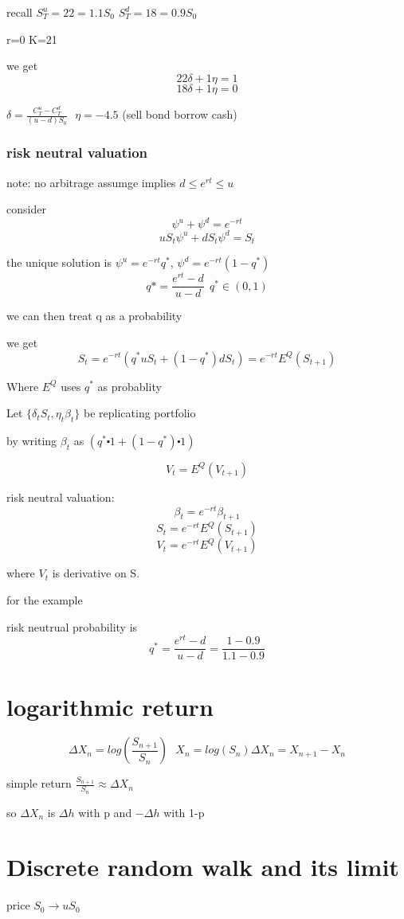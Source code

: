 \documentclass[10pt]{article}
\theoremstyle{break}
\begin{document}
recall $S_T^u = 22 =1.1S_0$
$S_T^d = 18 =0.9S_0$

r=0 K=21

we get 
$$22\delta+1\eta=1$$
$$18\delta+1\eta=0$$

$\delta=\frac{C^u_T-C^d_T}{(u-d)S_0}~~~\eta=-4.5$ (sell bond borrow cash)

\subsubsection{risk neutral valuation}
note: no arbitrage assumge implies $d\leq e^{rt}\leq u$

consider 
$$\psi^u+\psi^d=e^{-rt}$$
$$uS_t\psi^u+dS_t\psi^d=S_t$$

the unique solution is $\psi^u=e^{-rt}q^*$, $\psi^d=e^{-rt}(1-q^*)$
$$q*=\frac{e^{rt}-d}{u-d}~~q^*\in(0,1)$$

we can then treat q as a probability

we get 
$$S_t=e^{-rt}(q^*uS_t+(1-q^*)dS_t)=e^{-rt}E^Q(S_{t+1})$$

Where $E^Q$ uses $q^*$ as probablity


Let $\{\delta_tS_t, \eta_t\beta_t\}$ be replicating portfolio

by writing $\beta_t$ as $(q^*\centerdot 1+(1-q^*)\centerdot 1)$



$$V_t=E^Q(V_{t+1})$$

risk neutral valuation:
$$\beta_t=e^{-rt}\beta_{t+1}$$
$$S_t=e^{-rt}E^Q(S_{t+1})$$
$$V_t=e^{-rt}E^Q(V_{t+1})$$

where $V_t$ is derivative on S.

for the example 

risk neutrual probability is 
$$q^*=\frac{e^{rt}-d}{u-d}=\frac{1-0.9}{1.1-0.9}$$

\section{logarithmic return}
$$\Delta X_n=log(\frac{S_{n+1}}{S_n})~~~X_n=log(S_n) \Delta X_n=X_{n+1}-X_n$$

simple return $\frac{S_{n+1}}{S_n} \approx \Delta X_n$

so $\Delta X_n$ is $\Delta h$ with p and $-\Delta h$ with 1-p

\section{Discrete random walk and its limit}
price $S_0\rightarrow uS_0$
\end{document}
